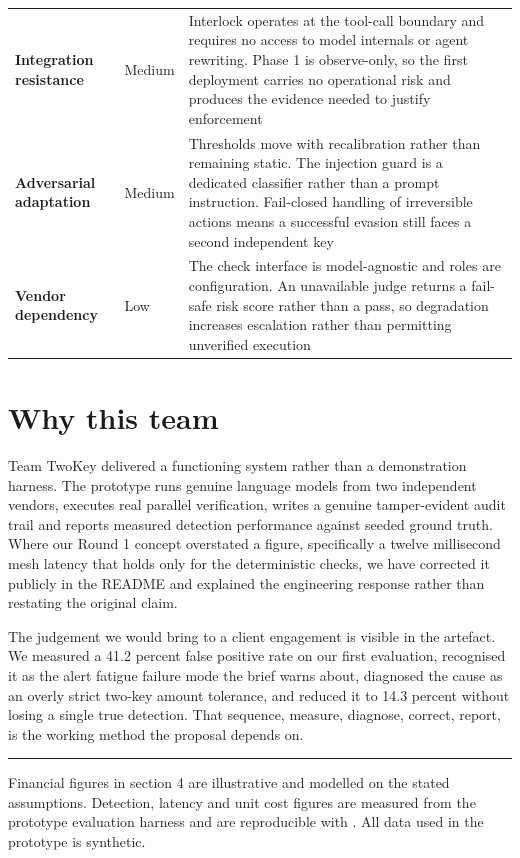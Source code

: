 \documentclass[10pt]{article}
\begin{document}
{\begin{xltabular}{\textwidth}{@{}L{0.205\textwidth}L{0.085\textwidth}Y@{}}
\textbf{Integration resistance} & \textcolor{warn}{Medium} & Interlock operates at the tool-call boundary and requires no access to model internals or agent rewriting. Phase 1 is observe-only, so the first deployment carries no operational risk and produces the evidence needed to justify enforcement \\
\textbf{Adversarial adaptation} & \textcolor{warn}{Medium} & Thresholds move with recalibration rather than remaining static. The injection guard is a dedicated classifier rather than a prompt instruction. Fail-closed handling of irreversible actions means a successful evasion still faces a second independent key \\
\textbf{Vendor dependency} & {\color{ink3}Low} & The check interface is model-agnostic and roles are configuration. An unavailable judge returns a fail-safe risk score rather than a pass, so degradation increases escalation rather than permitting unverified execution \\
\bottomrule
\end{xltabular}}

\section{Why this team}

Team TwoKey delivered a functioning system rather than a demonstration harness. The
prototype runs genuine language models from two independent vendors, executes real
parallel verification, writes a genuine tamper-evident audit trail and reports measured
detection performance against seeded ground truth. Where our Round 1 concept overstated a
figure, specifically a twelve millisecond mesh latency that holds only for the
deterministic checks, we have corrected it publicly in the README and explained the
engineering response rather than restating the original claim.

The judgement we would bring to a client engagement is visible in the artefact. We
measured a 41.2 percent false positive rate on our first evaluation, recognised it as the
alert fatigue failure mode the brief warns about, diagnosed the cause as an overly strict
two-key amount tolerance, and reduced it to 14.3 percent without losing a single true
detection. That sequence, measure, diagnose, correct, report, is the working method the
proposal depends on.

\vspace{10pt}
{\color{rule}\rule{\textwidth}{0.4pt}}\par\vspace{6pt}
{\footnotesize\color{ink3}
Financial figures in section 4 are illustrative and modelled on the stated assumptions.
Detection, latency and unit cost figures are measured from the prototype evaluation
harness and are reproducible with . All data used in the prototype is
synthetic.}
\end{document}
